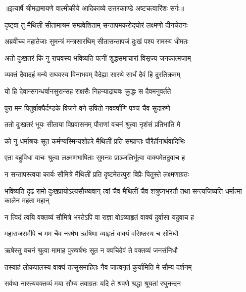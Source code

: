 {॥इत्यार्षे श्रीमद्रामायणे वाल्मीकीये आदिकाव्ये उत्तरकाण्डे अष्टचत्वारिंशः सर्गः॥}


\twolineshloka
{दृष्ट्वा तु मैथिलीं सीतामाश्रमं सम्प्रवेशिताम्}
{सन्तापमकरोद्घोरं लक्ष्मणो दीनचेतनः} %

\twolineshloka
{अब्रवीच्च महातेजाः सुमन्त्रं मन्त्रसारथिम्}
{सीतासन्तापजं दुःखं पश्य रामस्य धीमतः} %

\twolineshloka
{अतो दुःखतरं किं नु राघवस्य भविष्यति}
{पत्नीं शुद्धसमाचारां विसृज्य जनकात्मजाम्} %

\twolineshloka
{व्यक्तं दैवादहं मन्ये राघवस्य विनाभवम्}
{वैदेह्या सारथे सार्धं दैवं हि दुरतिक्रमम्} %

\twolineshloka
{यो हि देवान्सगन्धर्वानसुरान्सह राक्षसैः}
{निहन्याद्राघवः क्रुद्धः स दैवमनुवर्तते} %

\twolineshloka
{पुरा मम पितुर्वाक्यैर्दण्डके विजने वने}
{उषितो नववर्षाणि पञ्च चैव सुदारुणे} %

\twolineshloka
{ततो दुःखतरं भूयः सीताया विप्रवासनम्}
{पौराणां वचनं श्रुत्वा नृशंसं प्रतिभाति मे} %

\twolineshloka
{को नु धर्माश्रयः सूत कर्मण्यस्मिन्यशोहरे}
{मैथिलीं प्रति सम्प्राप्तः पौरैर्हीनार्थवादिभिः} %

\twolineshloka
{एता बहुविधा वाचः श्रुत्वा लक्ष्मणभाषिताः}
{सुमन्त्रः प्राञ्जलिर्भूत्वा वाक्यमेतदुवाच ह} %

\twolineshloka
{न सन्तापस्त्वया कार्यः सौमित्रे मैथिलीं प्रति}
{दृष्टमेतत्पुरा विप्रैः पितुस्ते लक्ष्मणाग्रतः} %

\threelineshloka
{भविष्यति दृढं रामो दुःखप्रायोऽल्पसौख्यवान्}
{त्वां चैव मैथिलीं चैव शत्रुघ्नभरतौ तथा}
{सन्त्यजिष्यति धर्मात्मा कालेन महता महान्} %

\twolineshloka
{न त्विदं त्वयि वक्तव्यं सौमित्रे भरतेऽपि वा}
{राज्ञा वोऽव्याहृतं वाक्यं दुर्वासा यदुवाच ह} %

\twolineshloka
{महाराजसमीपे च मम चैव नरर्षभ}
{ऋषिणा व्याहृतं वाक्यं वसिष्ठस्य च संनिधौ} %

\twolineshloka
{ऋषेस्तु वचनं श्रुत्वा मामाह पुरुषर्षभः}
{सूत न क्वचिदेवं ते वक्तव्यं जनसंनिधौ} %

\twolineshloka
{तस्याहं लोकपालस्य वाक्यं तत्सुसमाहितः}
{नैव जात्वनृतं कुर्यामिति मे सौम्य दर्शनम्} %

\twolineshloka
{सर्वथा नास्त्यवक्तव्यं मया सौम्य तवाग्रतः}
{यदि ते श्रवणे श्रद्धा श्रूयतां रघुनन्दन} %

